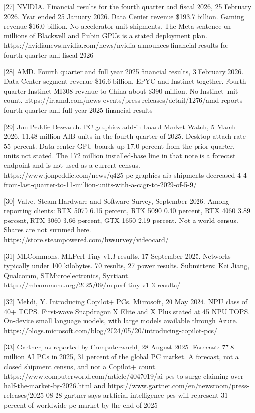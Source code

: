 \documentclass[
  10pt,
]{article}
\begin{document}
{[}27{]} NVIDIA. Financial results for the fourth quarter and fiscal
2026, 25 February 2026. Year ended 25 January 2026. Data Center revenue
\$193.7 billion. Gaming revenue \$16.0 billion. No accelerator unit
shipments. The Meta sentence on millions of Blackwell and Rubin GPUs is
a stated deployment plan.
https://nvidianews.nvidia.com/news/nvidia-announces-financial-results-for-fourth-quarter-and-fiscal-2026

{[}28{]} AMD. Fourth quarter and full year 2025 financial results, 3
February 2026. Data Center segment revenue \$16.6 billion, EPYC and
Instinct together. Fourth-quarter Instinct MI308 revenue to China about
\$390 million. No Instinct unit count.
https://ir.amd.com/news-events/press-releases/detail/1276/amd-reports-fourth-quarter-and-full-year-2025-financial-results

{[}29{]} Jon Peddie Research. PC graphics add-in board Market Watch, 5
March 2026. 11.48 million AIB units in the fourth quarter of 2025.
Desktop attach rate 55 percent. Data-center GPU boards up 17.0 percent
from the prior quarter, units not stated. The 172 million installed-base
line in that note is a forecast endpoint and is not used as a current
census.
https://www.jonpeddie.com/news/q425-pc-graphics-aib-shipments-decreased-4-4-from-last-quarter-to-11-million-units-with-a-cagr-to-2029-of-5-9/

{[}30{]} Valve. Steam Hardware and Software Survey, September 2026.
Among reporting clients: RTX 5070 6.15 percent, RTX 5090 0.40 percent,
RTX 4060 3.89 percent, RTX 3060 3.66 percent, GTX 1650 2.19 percent. Not
a world census. Shares are not summed here.
https://store.steampowered.com/hwsurvey/videocard/

{[}31{]} MLCommons. MLPerf Tiny v1.3 results, 17 September 2025.
Networks typically under 100 kilobytes. 70 results, 27 power results.
Submitters: Kai Jiang, Qualcomm, STMicroelectronics, Syntiant.
https://mlcommons.org/2025/09/mlperf-tiny-v1-3-results/

{[}32{]} Mehdi, Y. Introducing Copilot+ PCs. Microsoft, 20 May 2024. NPU
class of 40+ TOPS. First-wave Snapdragon X Elite and X Plus stated at 45
NPU TOPS. On-device small language models, with large models available
through Azure.
https://blogs.microsoft.com/blog/2024/05/20/introducing-copilot-pcs/

{[}33{]} Gartner, as reported by Computerworld, 28 August 2025.
Forecast: 77.8 million AI PCs in 2025, 31 percent of the global PC
market. A forecast, not a closed shipment census, and not a Copilot+
count.
https://www.computerworld.com/article/4047019/ai-pcs-to-surge-claiming-over-half-the-market-by-2026.html
and
https://www.gartner.com/en/newsroom/press-releases/2025-08-28-gartner-says-artificial-intelligence-pcs-will-represent-31-percent-of-worldwide-pc-market-by-the-end-of-2025
\end{document}
